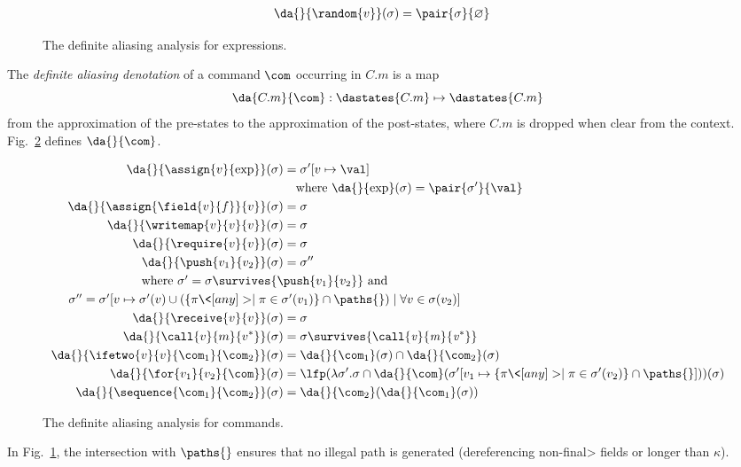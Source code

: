 \begin{definition}
\begin{figure}[t]
\begin{align*}
      \da{}{\random{v}}(\sigma)&=\pair{\sigma}{\varnothing}
    \end{align*}
    \caption{The definite aliasing analysis for expressions.}
    \label{fig:daa_expressions}
  \end{figure}
%
  The \emph{definite aliasing denotation} of a command $\com$ occurring in $C.m$ is a map
  \[
  \da{C.m}{\com}:\dastates{C.m}\mapsto\dastates{C.m}
  \]
  from the approximation of the pre-states to the approximation of the post-states,
  where $C.m$ is dropped when clear from the context.
  Fig.~\ref{fig:daa_commands} defines $\da{}{\com}$.
%
  \begin{figure}[t]
    \begin{align*}
      \da{}{\assign{v}{\exp}}(\sigma)&=\sigma'[v\mapsto\val]\\
      &\quad\text{where $\da{}{\exp}(\sigma)=\pair{\sigma'}{\val}$}\\
      \da{}{\assign{\field{v}{f}}{v}}(\sigma)&=\sigma\\
      \da{}{\writemap{v}{v}{v}}(\sigma)&=\sigma\\
      \da{}{\require{v}{v}}(\sigma)&=\sigma\\
      \da{}{\push{v_1}{v_2}}(\sigma)&=\sigma''\\
      \noalign{\centering where $\sigma'=\sigma\survives{\push{v_1}{v_2}}$ and $\sigma''=\sigma'[v\mapsto\sigma'(v)\cup(\{\pi\<[any]>\mid\pi\in\sigma'(v_1)\}\cap\paths{})
          \mid\forall v\in\sigma(v_2)]$}
      \da{}{\receive{v}{v}}(\sigma)&=\sigma\\
      \da{}{\call{v}{m}{v^*}}(\sigma)&=\sigma\survives{\mathit{\call{v}{m}{v^*}}}\\
      \da{}{\ifetwo{v}{v}{\com_1}{\com_2}}(\sigma)&=\da{}{\com_1}(\sigma)\cap\da{}{\com_2}(\sigma)\\
      \da{}{\for{v_1}{v_2}{\com}}(\sigma)&=\lfp(\lambda\sigma'.\sigma\cap\da{}{\com}(\sigma'[v_1\mapsto\{\pi\<[any]>\mid\pi\in\sigma'(v_2)\}\cap\paths{}]))(\sigma)\\
      \da{}{\sequence{\com_1}{\com_2}}(\sigma)&=\da{}{\com_2}(\da{}{\com_1}(\sigma))
    \end{align*}
    \caption{The definite aliasing analysis for commands.}
    \label{fig:daa_commands}
  \end{figure}
%
\end{definition}
%
In Fig.~\ref{fig:daa_expressions},
the intersection with $\paths{}$ ensures that no illegal path
is generated (\ieinitial dereferencing non-\<final> fields or longer than $\kappa$).

